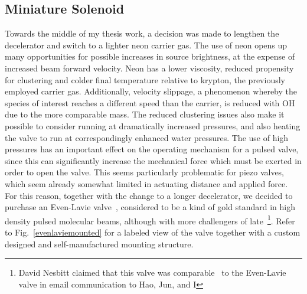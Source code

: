 \subsection{Miniature Solenoid}\label{evenvsec}

Towards the middle of my thesis work, a decision was made to lengthen the decelerator and switch to a lighter neon carrier gas.
The use of neon opens up many opportunities for possible increases in source brightness, at the expense of increased beam forward velocity.
Neon has a lower viscosity, reduced propensity for clustering and colder final temperature relative to krypton, the previously employed carrier gas.
Additionally, velocity slippage, a phenomenon whereby the species of interest reaches a different speed than the carrier, is reduced with OH due to the more comparable mass.
The reduced clustering issues also make it possible to consider running at dramatically increased pressures, and also heating the valve to run at correspondingly enhanced water pressures.
The use of high pressures has an important effect on the operating mechanism for a pulsed valve, since this can significantly increase the mechanical force which must be exerted in order to open the valve.
This seems particularly problematic for piezo valves, which seem already somewhat limited in actuating distance and applied force.
For this reason, together with the change to a longer decelerator, we decided to purchase an Even-Lavie valve~\cite{Even2014,Even2015}, considered to be a kind of gold standard in high density pulsed molecular beams, although with more challengers of late~\footnote{David Nesbitt claimed that this valve was comparable~\cite{Irimia2009} to the Even-Lavie valve in email communication to Hao, Jun, and I}.
Refer to Fig.~\ref{evenlaviemounted} for a labeled view of the valve together with a custom designed and self-manufactured mounting structure.
